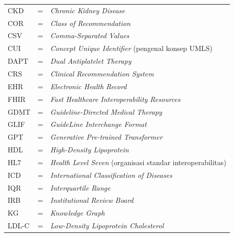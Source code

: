 \begin{longtable}{llp{3.6in}}
	CKD     & \hspace{1cm} = & \emph{Chronic Kidney Disease} \\
	COR     & \hspace{1cm} = & \emph{Class of Recommendation} \\
	CSV     & \hspace{1cm} = & \emph{Comma-Separated Values} \\
	CUI     & \hspace{1cm} = & \emph{Concept Unique Identifier} (pengenal konsep UMLS) \\
	DAPT    & \hspace{1cm} = & \emph{Dual Antiplatelet Therapy} \\
	CRS     & \hspace{1cm} = & \emph{Clinical Recommendation System} \\
	EHR     & \hspace{1cm} = & \emph{Electronic Health Record} \\
	FHIR    & \hspace{1cm} = & \emph{Fast Healthcare Interoperability Resources} \\
	GDMT    & \hspace{1cm} = & \emph{Guideline-Directed Medical Therapy} \\
	GLIF    & \hspace{1cm} = & \emph{GuideLine Interchange Format} \\
	GPT     & \hspace{1cm} = & \emph{Generative Pre-trained Transformer} \\
	HDL     & \hspace{1cm} = & \emph{High-Density Lipoprotein} \\
	HL7     & \hspace{1cm} = & \emph{Health Level Seven} (organisasi standar interoperabilitas) \\
	ICD     & \hspace{1cm} = & \emph{International Classification of Diseases} \\
	IQR     & \hspace{1cm} = & \emph{Interquartile Range} \\
	IRB     & \hspace{1cm} = & \emph{Institutional Review Board} \\
	KG      & \hspace{1cm} = & \emph{Knowledge Graph} \\
	LDL-C   & \hspace{1cm} = & \emph{Low-Density Lipoprotein Cholesterol} \\

\end{longtable}
